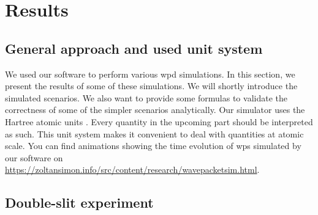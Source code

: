 \section{Results}
\label{sec:results}

\subsection{General approach and used unit system}

We used our software to perform various \acrshort{wpd} simulations.
In this section, we present the results of some of these simulations.
We will shortly introduce the simulated scenarios.
We also want to provide some formulas to validate the correctness of some of the simpler scenarios analytically.
Our simulator uses the Hartree atomic units \cite{hartree_1928}.
Every quantity in the upcoming part should be interpreted as such.
This unit system makes it convenient to deal with quantities at atomic scale.
You can find animations showing the time evolution of \acrshort{wp}s simulated by our software on  \url{https://zoltansimon.info/src/content/research/wavepacketsim.html}.

\subsection{Double-slit experiment}

